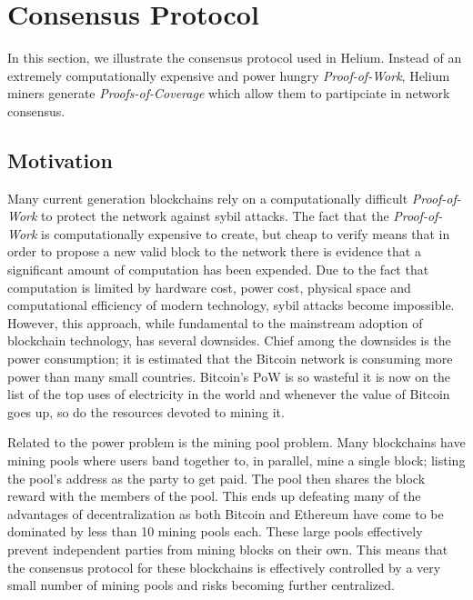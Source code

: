 \documentclass[10pt, nonatbib, nocopyrightspace, reprint]{sigplanconf}
\begin{document}
\begin{description}
\end{description}

\section{Consensus Protocol}\label{consensus}

In this section, we illustrate the consensus protocol used in Helium. Instead of an extremely computationally expensive and power hungry \emph{Proof-of-Work}, Helium miners generate \emph{Proofs-of-Coverage} which allow them to partipciate in network consensus.

\subsection{Motivation}

Many current generation blockchains rely on a computationally difficult \emph{Proof-of-Work} to protect the network against sybil attacks. The fact that the \emph{Proof-of-Work} is computationally expensive to create, but cheap to verify means that in order to propose a new valid block to the network there is evidence that a significant amount of computation has been expended. Due to the fact that computation is limited by hardware cost, power cost, physical space and computational efficiency of modern technology, sybil attacks become impossible. However, this approach, while fundamental to the mainstream adoption of blockchain technology, has several downsides. Chief among the downsides is the power consumption; it is estimated that the Bitcoin network is consuming more power than many small countries. Bitcoin's PoW is so wasteful it is now on the list of the top uses of electricity in the world and whenever the value of Bitcoin goes up, so do the resources devoted to mining it.

Related to the power problem is the mining pool problem. Many blockchains have mining pools where users band together to, in parallel, mine a single block; listing the pool's address as the party to get paid. The pool then shares the block reward with the members of the pool. This ends up defeating many of the advantages of decentralization as both Bitcoin and Ethereum have come to be dominated by less than 10 mining pools each. These large pools effectively prevent independent parties from mining blocks on their own. This means that the consensus protocol for these blockchains is effectively controlled by a very small number of mining pools and risks becoming further centralized.
\end{document}
